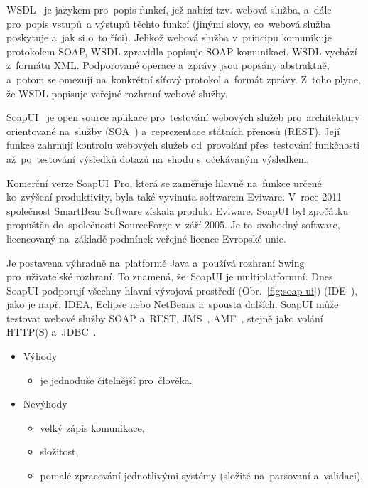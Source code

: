 WSDL~\cite{wsdl} je jazykem pro~popis funkcí, jež nabízí tzv. webová služba, a~dále pro~popis vstupů~a výstupů těchto funkcí (jinými slovy, co~webová služba poskytuje a~jak si o~to říci). Jelikož webová služba v~principu komunikuje protokolem SOAP, WSDL zpravidla popisuje SOAP komunikaci. WSDL vychází z~formátu XML. Podporované operace a~zprávy jsou popsány abstraktně, a~potom se omezují na~konkrétní síťový protokol a~formát zprávy. Z~toho plyne, že WSDL popisuje veřejné rozhraní webové služby.

SoapUI~\cite{soapui} je open source aplikace pro~testování webových služeb pro~architektury orientované na~služby (SOA~\cite{soa}) a~reprezentace státních přenosů (REST). Její funkce zahrnují kontrolu webových služeb od~provolání přes~testování funkčnosti až~po~testování výsledků dotazů na~shodu s~očekávaným výsledkem.

Komerční verze SoapUI~Pro, která se zaměřuje hlavně na~funkce určené ke~zvýšení produktivity, byla také vyvinuta softwarem Eviware. V~roce 2011 společnost SmartBear Software získala produkt Eviware. SoapUI byl zpočátku propuštěn do~společnosti SourceForge v~září 2005. Je to~svobodný software, licencovaný na~základě podmínek veřejné licence Evropské unie. 

Je postavena výhradně na~platformě Java a~používá rozhraní Swing pro~uživatelské rozhraní. To znamená, že~SoapUI je multiplatformní. Dnes SoapUI podporují všechny hlavní vývojová prostředí (Obr.~\ref{fig:soap-ui}) (IDE~\cite{ide}), jako je např. IDEA, Eclipse nebo NetBeans a~spousta dalších. SoapUI může testovat webové služby SOAP a~REST, JMS~\cite{jms}, AMF~\cite{amf}, stejně jako volání HTTP(S) a~JDBC~\cite{jdbc}.


\begin{itemize}
	\setlength{\parskip}{0pt}
	\setlength{\itemsep}{0pt}
	\item {Výhody}
	\begin{itemize}
		\setlength{\parskip}{0pt}
		\setlength{\itemsep}{0pt}
		\item {je jednoduše čitelnější pro~člověka.}
	\end{itemize}	
	
	\item {Nevýhody}
	\begin{itemize}
		\setlength{\parskip}{0pt}
		\setlength{\itemsep}{0pt}
		\item {velký zápis komunikace,}
		\item {složitost,}
		\item {pomalé zpracování jednotlivými systémy (složité na~parsovaní a~validaci).}
	\end{itemize}
\end{itemize}

